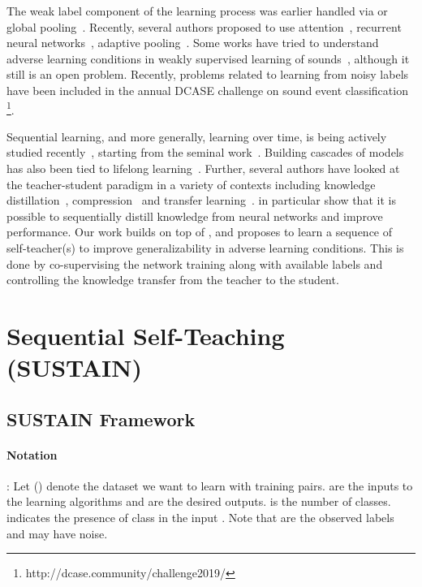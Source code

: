 \documentclass{article}
\begin{document}
The weak label component of the learning process was earlier handled via  or  global pooling~\cite{su2017weakly,kumar2017knowledge}. 
Recently, several authors proposed to use attention~\cite{kong2019weakly,wang2018comparing,chen2018class}, recurrent neural networks~\cite{adavanne2017sound}, adaptive pooling~\cite{mcfee2018adaptive}. 
Some works have tried to understand adverse learning conditions in weakly supervised learning of sounds~\cite{shah2018closer, kumar2019learning}, although it still is an open problem. 
Recently, problems related to learning from noisy labels have been included in the annual DCASE challenge on sound event classification~\cite{fonseca2019audio} \footnote{http://dcase.community/challenge2019/}. 

Sequential learning, and more generally, learning over time, 
is being actively studied recently~\cite{parisi2019continual}, 
starting from the seminal work~\cite{minsky1994society}. 
Building cascades of models has also been tied to lifelong learning~\cite{silver2013lifelong,ruvolo2013ella}.
Further, several authors have looked at the teacher-student paradigm in a variety of contexts including 
knowledge distillation~\cite{hinton2015distilling,furlanello2018born,chen2017learning,mirzadeh2019improved}, compression~\cite{polino2018model} and transfer learning~\cite{Yim_2017_CVPR,weinshall2018curriculum}. \cite{furlanello2018born} in particular show that it is possible to sequentially distill knowledge from neural networks and improve performance. Our work builds on top of \cite{kumar2020secost}, and proposes to learn a sequence of self-teacher(s) to improve generalizability  in adverse learning conditions. This is done by co-supervising the network training along with available labels and controlling the knowledge transfer from the teacher to the student. 



\section{Sequential Self-Teaching (SUSTAIN)} \label{sec:sustain}

\subsection{SUSTAIN Framework} \label{sec:framework}

\paragraph{Notation} \label{para:notation}: 
Let  () denote the dataset we want to learn with  training pairs.  are the inputs to the learning algorithms and   are the desired outputs.  is the number of classes.
 indicates the presence of  class in the input . Note that  are the observed labels and may have noise. 
\end{document}
